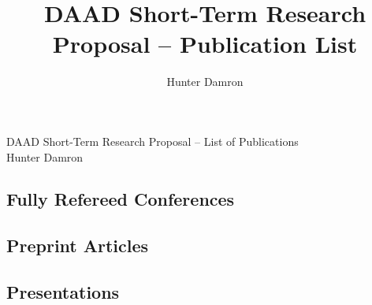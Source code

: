 \documentclass{article}
\title{\Large DAAD Short-Term Research Proposal -- Publication List}
\author{Hunter Damron}
\date{}
\begin{document}
	\begin{center}
		\large
		DAAD Short-Term Research Proposal -- List of Publications \\[4pt]
		\normalsize
		Hunter Damron \\
	\end{center}
	\subsection*{Fully Refereed Conferences}
	\nocite{uwcl,marios_trajopt,joshi_deepurl}
	\printbibliography[heading=none,category=refereed]{}
	\subsection*{Preprint Articles}
	\nocite{riss2020}
	\printbibliography[heading=none,category=preprint]{}
	\subsection*{Presentations}
	\nocite{damron2019}
	\printbibliography[heading=none,category=presentation]{}
\end{document}
